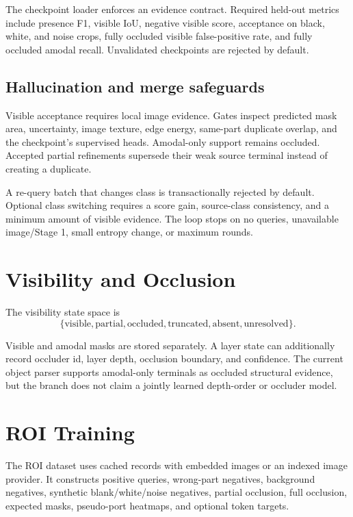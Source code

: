 \documentclass[11pt]{article}
\begin{document}
The checkpoint loader enforces an evidence contract. Required held-out metrics
include presence F1, visible IoU, negative visible score, acceptance on black,
white, and noise crops, fully occluded visible false-positive rate, and fully
occluded amodal recall. Unvalidated checkpoints are rejected by default.

\subsection{Hallucination and merge safeguards}

Visible acceptance requires local image evidence. Gates inspect predicted mask
area, uncertainty, image texture, edge energy, same-part duplicate overlap, and
the checkpoint's supervised heads. Amodal-only support remains occluded. Accepted
partial refinements supersede their weak source terminal instead of creating a
duplicate.

A re-query batch that changes class is transactionally rejected by default.
Optional class switching requires a score gain, source-class consistency, and a
minimum amount of visible evidence. The loop stops on no queries, unavailable
image/Stage 1, small entropy change, or maximum rounds.

\section{Visibility and Occlusion}

The visibility state space is
\[
\{\text{visible},\text{partial},\text{occluded},\text{truncated},
\text{absent},\text{unresolved}\}.
\]

Visible and amodal masks are stored separately. A layer state can additionally
record occluder id, layer depth, occlusion boundary, and confidence. The current
object parser supports amodal-only terminals as occluded structural evidence, but
the branch does not claim a jointly learned depth-order or occluder model.

\section{ROI Training}

The ROI dataset uses cached records with embedded images or an indexed image
provider. It constructs positive queries, wrong-part negatives, background
negatives, synthetic blank/white/noise negatives, partial occlusion, full
occlusion, expected masks, pseudo-port heatmaps, and optional token targets.
\end{document}
